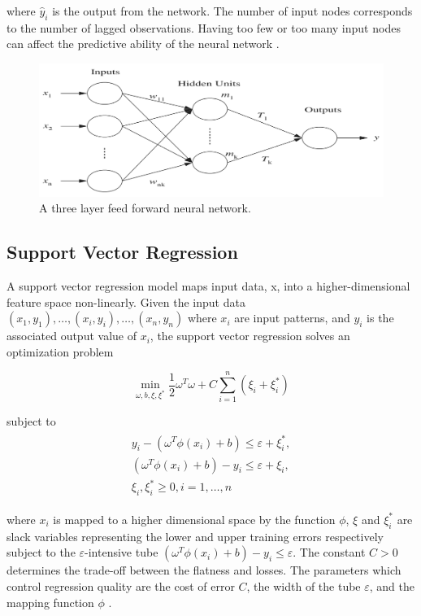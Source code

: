 where $\hat{y}_i$ is the output from the network. The number of input nodes corresponds to the number of lagged observations. Having too few or too many input nodes can affect the predictive ability of the neural network \cite{Pao2007}.



\begin{figure}
	\includegraphics[width=\textwidth]{Chapter5/figures/feedforwardneuralnet}
	\caption{A three layer feed forward neural network.}
	\label{fig:mlp}
\end{figure}


\subsection{Support Vector Regression}

A support vector regression model maps input data, x, into a higher-dimensional feature space non-linearly. Given the input data\\ $(x_1,y_1), \ldots,(x_i,y_i),\ldots,(x_n,y_n)\allowbreak$ where $x_i$ are input patterns, and $y_i$ is the associated output value of $x_i$, the support vector regression solves an optimization problem \cite{Shu2006,Chen2004}

\begin{equation}
\min_{\omega,b,\xi,\xi^{*}}\frac{1}{2}\omega^T\omega+C\sum_{i=1}^{n}(\xi_i+\xi_i^*)
\end{equation}

subject to
\begin{align}
\begin{multlined}
\label{svr:constrains}
y_i-(\omega^T\phi(x_i)+b)\leq\varepsilon+\xi_i^{*},\\
(\omega^T\phi(x_i)+b)-y_i\leq\varepsilon+\xi_i,\\
\xi_i,\xi^*_i\geq0,i=1,\ldots,n
\end{multlined}
\end{align}


where $x_i$ is mapped to a higher dimensional space by the function $\phi$, $\xi$ and $\xi^*_i$ are slack variables representing the lower and upper training errors respectively subject to the $\varepsilon$-intensive tube $(\omega^T\phi(x_i)+b)-y_i\leq\varepsilon$. The constant $C>0$ determines the trade-off between the flatness and losses. The parameters which control regression quality are the cost of error $C$, the width of the tube $\varepsilon$, and the mapping function $\phi$ \cite{Shu2006,Chen2004}. 

